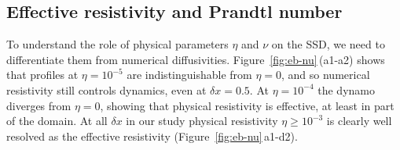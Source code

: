 \documentclass[preprint2]{aastex63}
\newcommand\pc{~ {\rm pc}}
\newcommand\dx{ {\delta x}}
\newcommand{\fg}[1]{\textcolor{midgreen}{#1}}
\begin{document}

\subsection{\fg{Effective resistivity and Prandtl number}} \label{sec:eta}

 \fg{To understand the role of physical parameters $\eta$ and $\nu$ on the
 SSD, we need to differentiate them from numerical diffusivities.}
 Figure~\ref{fig:eb-nu}\,(a1-a2) shows that profiles at $\eta=10^{-5}$ are
 indistinguishable from $\eta=0$, and so numerical resistivity still controls
 dynamics, even at $\delta x = 0.5$.
 At $\eta=10^{-4}$ the dynamo diverges from $\eta=0$, showing that physical
 resistivity is \fg{effective}, at least in part of the domain.
 At all $\dx$ in our study physical resistivity $\eta\geq10^{-3}$ is clearly
 well resolved \fg{as the effective
 resistivity (Figure~\ref{fig:eb-nu}\,a1-d2)}.

\end{document}
